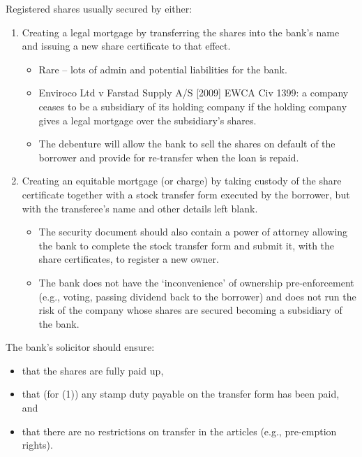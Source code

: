 \documentclass[
]{article}
\providecommand{\tightlist}{%
  \setlength{\itemsep}{0pt}\setlength{\parskip}{0pt}}
\begin{document}
Registered shares usually secured by either:

\begin{enumerate}
\tightlist
\item
  Creating a legal mortgage by transferring the shares into the bank's
  name and issuing a new share certificate to that effect.

  \begin{itemize}
  \tightlist
  \item
    Rare -- lots of admin and potential liabilities for the bank.
  \item
    Enviroco Ltd v Farstad Supply A/S {[}2009{]} EWCA Civ 1399: a
    company ceases to be a subsidiary of its holding company if the
    holding company gives a legal mortgage over the subsidiary's shares.
  \item
    The debenture will allow the bank to sell the shares on default of
    the borrower and provide for re-transfer when the loan is repaid.
  \end{itemize}
\item
  Creating an equitable mortgage (or charge) by taking custody of the
  share certificate together with a stock transfer form executed by the
  borrower, but with the transferee's name and other details left blank.

  \begin{itemize}
  \tightlist
  \item
    The security document should also contain a power of attorney
    allowing the bank to complete the stock transfer form and submit it,
    with the share certificates, to register a new owner.
  \item
    The bank does not have the `inconvenience' of ownership
    pre-enforcement (e.g., voting, passing dividend back to the
    borrower) and does not run the risk of the company whose shares are
    secured becoming a subsidiary of the bank.
  \end{itemize}
\end{enumerate}

The bank's solicitor should ensure:

\begin{itemize}
\tightlist
\item
  that the shares are fully paid up,
\item
  that (for (1)) any stamp duty payable on the transfer form has been
  paid, and
\item
  that there are no restrictions on transfer in the articles (e.g.,
  pre-emption rights).
\end{itemize}
\end{document}
